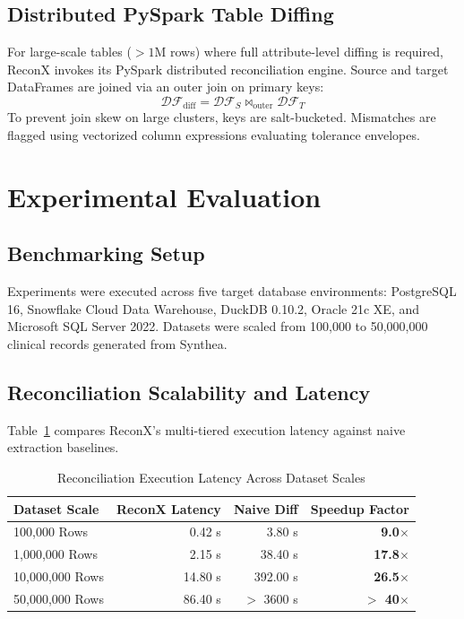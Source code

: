 \documentclass[10pt,journal,compsoc]{IEEEtran}
\begin{document}
\subsection{Distributed PySpark Table Diffing}
For large-scale tables ($> 1\text{M}$ rows) where full attribute-level diffing is required, ReconX invokes its PySpark distributed reconciliation engine. Source and target DataFrames are joined via an outer join on primary keys:
\begin{equation}
\mathcal{DF}_{\text{diff}} = \mathcal{DF}_S \bowtie_{\text{outer}} \mathcal{DF}_T
\end{equation}
To prevent join skew on large clusters, keys are salt-bucketed. Mismatches are flagged using vectorized column expressions evaluating tolerance envelopes.

\section{Experimental Evaluation}
\subsection{Benchmarking Setup}
Experiments were executed across five target database environments: PostgreSQL 16, Snowflake Cloud Data Warehouse, DuckDB 0.10.2, Oracle 21c XE, and Microsoft SQL Server 2022. Datasets were scaled from 100,000 to 50,000,000 clinical records generated from Synthea.

\subsection{Reconciliation Scalability and Latency}
Table~\ref{tab:benchmarks} compares ReconX's multi-tiered execution latency against naive extraction baselines.

\begin{table}[h]
\centering
\caption{Reconciliation Execution Latency Across Dataset Scales}
\label{tab:benchmarks}
\begin{tabular}{lrrr}
\toprule
\textbf{Dataset Scale} & \textbf{ReconX Latency} & \textbf{Naive Diff} & \textbf{Speedup Factor} \\
\midrule
100,000 Rows          & 0.42 s                  & 3.80 s              & \textbf{9.0$\times$} \\
1,000,000 Rows        & 2.15 s                  & 38.40 s             & \textbf{17.8$\times$} \\
10,000,000 Rows       & 14.80 s                 & 392.00 s            & \textbf{26.5$\times$} \\
50,000,000 Rows       & 86.40 s                 & $>$ 3600 s          & \textbf{$>$ 40$\times$} \\
\bottomrule
\end{tabular}
\end{table}
\end{document}
